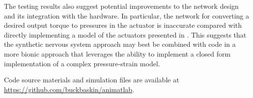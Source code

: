 \documentclass[letterpaper, 10 pt, conference]{IEEEconf} %
\begin{document}
The testing results also suggest potential improvements to the network design and its integration with the hardware. In particular, the network for converting
a desired output torque to pressures in the actuator is inaccurate compared with
directly implementing a model of the actuators presented in \cite{HuntPMuscles}. This suggests that the synthetic nervous system approach may best be combined
with code in a more bionic approach that leverages the ability to implement a
closed form implementation of a complex pressure-strain model.

Code source materials and simulation files are available at \url{https://github.com/buckbaskin/animatlab}.

\printbibliography[heading=bibintoc, title={Bibliography}]
\end{document}
